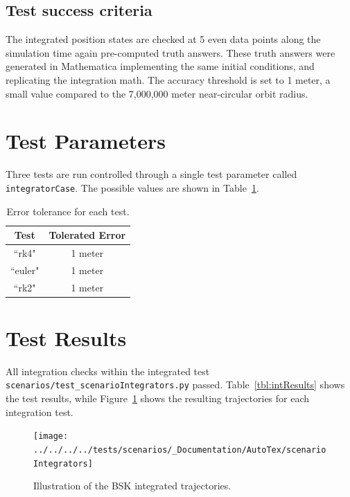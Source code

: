 \subsection{Test success criteria}
The integrated position states are checked at 5 even data points along the simulation time again pre-computed truth answers.  These truth answers were generated in Mathematica implementing the same initial conditions, and replicating the integration math.    The accuracy threshold is set to 1 meter, a small value compared to the 7,000,000 meter near-circular orbit radius.



\section{Test Parameters}
Three tests are run controlled through a single test parameter called {\tt integratorCase}.  The possible values are shown in Table~\ref{tbl:intCases}.

\begin{table}[htbp]
	\caption{Error tolerance for each test.}
	\label{tbl:intCases}
	\centering \fontsize{10}{10}\selectfont
	\begin{tabular}{ c | c } %
		\hline\hline
		\textbf{Test}   	      	               & \textbf{Tolerated Error} 						           \\ \hline
		``rk4"                           & 1 meter	  \\
		``euler"                           & 1 meter	  \\
		``rk2"                           & 1 meter	  \\
		\hline\hline
	\end{tabular}
\end{table}

\section{Test Results}
All integration checks within the integrated test {\tt scenarios/test\_scenarioIntegrators.py} passed.  Table~\ref{tbl:intResults} shows the test results, while Figure~\ref{fig:intResultsPython} shows the resulting trajectories for each integration test.

\begin{figure}[t]
	\centerline{
		\texttt{[image: ../../../../tests/scenarios/\_Documentation/AutoTex/scenarioIntegrators]}
	}
	\caption{Illustration of the BSK integrated trajectories.}
	\label{fig:intResultsPython}
\end{figure}

